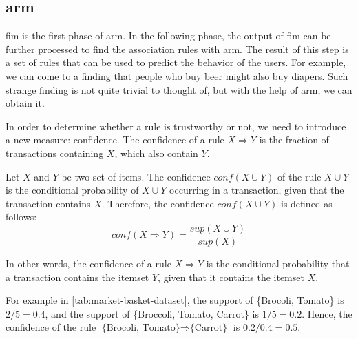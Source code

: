 \subsection{\Acl{arm}}
\label{sub:association_rule_mining}
\Ac{fim} is the first phase of \ac{arm}.
In the following phase, the output of \ac{fim} can be further processed to find the association rules with \acl{arm}.
The result of this step is a set of rules that can be used to predict the behavior of the users.
For example, we can come to a finding that people who buy beer might also buy diapers.
Such strange finding is not quite trivial to thought of, but with the help of \acl{arm}, we can obtain it.

In order to determine whether a rule is trustworthy or not, we need to introduce a new measure: confidence.
The confidence of a rule $X \Rightarrow Y$ is the fraction of transactions containing $X$, which also contain $Y$.
\begin{definition}
    Let $X$ and $Y$ be two set of items.
    The confidence $conf(X \cup Y)$ of the rule $X \cup Y$ is the conditional probability of $X \cup Y$ occurring in a transaction, given that the transaction contains $X$.
    Therefore, the confidence $conf(X \cup Y)$ is defined as follows:
    \begin{equation}
        conf(X \Rightarrow Y) = \frac{sup(X \cup Y)}{sup(X)}
    \end{equation}
\end{definition}
In other words, the confidence of a rule $X \Rightarrow Y$ is the conditional probability that a transaction contains the itemset $Y$, given that it contains the itemset $X$.

For example in \autoref{tab:market-basket-dataset}, the support of \{Brocoli, Tomato\} is $2/5=0.4$, and the support of \{Broccoli, Tomato, Carrot\} is $1/5=0.2$.
Hence, the confidence of the rule $\text{\{Brocoli, Tomato\}} \Rightarrow \text{\{Carrot\}}$ is $0.2 / 0.4 = 0.5$.


